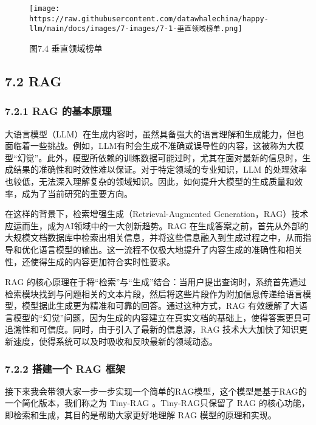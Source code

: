 \documentclass[
]{article}
\begin{document}
\begin{figure}[htbp]\centering
\texttt{[image: https://raw.githubusercontent.com/datawhalechina/happy-llm/main/docs/images/7-images/7-1-垂直领域榜单.png]}
\caption{图7.4 垂直领域榜单}
\end{figure}

\subsection{7.2 RAG}\label{rag}

\subsubsection{7.2.1 RAG
的基本原理}\label{rag-ux7684ux57faux672cux539fux7406}

大语言模型（LLM）在生成内容时，虽然具备强大的语言理解和生成能力，但也面临着一些挑战。例如，LLM有时会生成不准确或误导性的内容，这被称为大模型``幻觉''。此外，模型所依赖的训练数据可能过时，尤其在面对最新的信息时，生成结果的准确性和时效性难以保证。对于特定领域的专业知识，LLM
的处理效率也较低，无法深入理解复杂的领域知识。因此，如何提升大模型的生成质量和效率，成为了当前研究的重要方向。

在这样的背景下，检索增强生成（Retrieval-Augmented
Generation，RAG）技术应运而生，成为AI领域中的一大创新趋势。RAG
在生成答案之前，首先从外部的大规模文档数据库中检索出相关信息，并将这些信息融入到生成过程之中，从而指导和优化语言模型的输出。这一流程不仅极大地提升了内容生成的准确性和相关性，还使得生成的内容更加符合实时性要求。

RAG
的核心原理在于将``检索''与``生成''结合：当用户提出查询时，系统首先通过检索模块找到与问题相关的文本片段，然后将这些片段作为附加信息传递给语言模型，模型据此生成更为精准和可靠的回答。通过这种方式，RAG
有效缓解了大语言模型的``幻觉''问题，因为生成的内容建立在真实文档的基础上，使得答案更具可追溯性和可信度。同时，由于引入了最新的信息源，RAG
技术大大加快了知识更新速度，使得系统可以及时吸收和反映最新的领域动态。

\subsubsection{7.2.2 搭建一个 RAG
框架}\label{ux642dux5efaux4e00ux4e2a-rag-ux6846ux67b6}

接下来我会带领大家一步一步实现一个简单的RAG模型，这个模型是基于RAG的一个简化版本，我们称之为
Tiny-RAG 。Tiny-RAG只保留了 RAG
的核心功能，即检索和生成，其目的是帮助大家更好地理解 RAG
模型的原理和实现。
\end{document}
